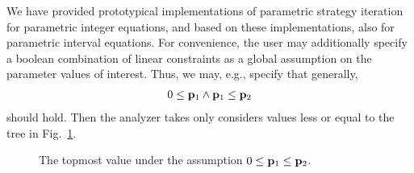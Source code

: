 \documentclass[a4paper]{easychair}
\begin{document}
We have provided prototypical implementations of parametric strategy iteration for
parametric 
integer equations, and based on these implementations, also for
parametric 
interval equations.
For convenience, the user may additionally specify 
a boolean combination of linear constraints as 
a global assumption on the parameter values of interest.
Thus, we may, e.g., specify that generally, 
\[
\begin{array}{l}
0\leq {\bf p}_1 \wedge {\bf p}_1 \leq {\bf p}_2 
\end{array}
\]
should hold. Then the analyzer takes 
only considers values less or equal to the tree
in Fig.\ \ref{f:top}.
\begin{figure}
\begin{center}
\caption{\label{f:top}The topmost value under the assumption
	$0\leq {\bf p}_1\leq{\bf p}_2$.}
\end{center}
\end{figure}
\end{document}
